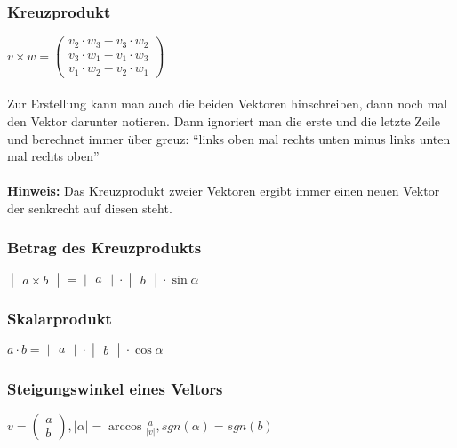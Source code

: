 \documentclass[6pt,a4paper]{scrartcl}
\newcommand{\abs}[1]{\ensuremath{\left\vert#1\right\vert}}
\begin{document}
\begin{multicols*}{3}
\subsubsection{Kreuzprodukt}
$v \times w = \begin{pmatrix}
v_2 \cdot w_3 - v_3 \cdot w_2 \\
v_3 \cdot w_1 - v_1 \cdot w_3 \\
v_1 \cdot w_2 - v_2 \cdot w_1
\end{pmatrix}$
\\
\\
Zur Erstellung kann man auch die beiden Vektoren hinschreiben, dann noch mal den Vektor darunter notieren. Dann ignoriert man die erste und die letzte Zeile und berechnet immer über greuz: ``links oben mal rechts unten minus links unten mal rechts oben''\\
\\
\textbf{Hinweis:} Das Kreuzprodukt zweier Vektoren ergibt immer einen neuen Vektor der senkrecht auf diesen steht.\\
\subsubsection{Betrag des Kreuzprodukts}
$\begin{vmatrix}a \times b\end{vmatrix} = \begin{vmatrix}a\end{vmatrix} \cdot \begin{vmatrix}b\end{vmatrix} \cdot \sin \alpha$\\
\subsubsection{Skalarprodukt}
$a \cdot b = \begin{vmatrix}a\end{vmatrix} \cdot \begin{vmatrix}b\end{vmatrix} \cdot \cos \alpha$\\
\subsubsection{Steigungswinkel eines Veltors}
$v = \begin{pmatrix}a\\b\end{pmatrix}, \abs{\alpha}=\arccos{\frac{a}{\abs{v}}}, sgn(\alpha)=sgn(b)$
\\

\end{multicols*}
\end{document}
